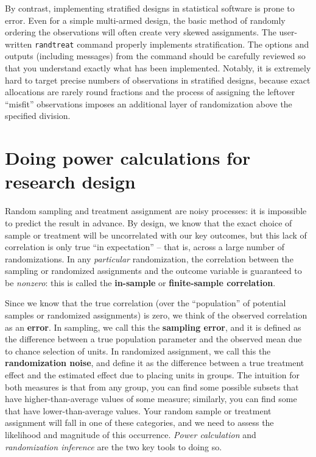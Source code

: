 By contrast, implementing stratified designs in statistical software is prone to error.
Even for a simple multi-armed design,
the basic method of randomly ordering the observations
will often create very skewed assignments.
The user-written \texttt{randtreat} command properly implements stratification.
The options and outputs (including messages) from the command should be carefully reviewed
so that you understand exactly what has been implemented.
Notably, it is extremely hard to target precise numbers of observations
in stratified designs, because exact allocations are rarely round fractions
and the process of assigning the leftover ``misfit'' observations
imposes an additional layer of randomization above the specified division.


\section{Doing power calculations for research design}

Random sampling and treatment assignment are noisy processes:
it is impossible to predict the result in advance.
By design, we know that the exact choice of sample or treatment
will be uncorrelated with our key outcomes,
but this lack of correlation is only true ``in expectation'' --
that is, across a large number of randomizations.
In any \textit{particular} randomization,
the correlation between the sampling or randomized assignments and the outcome variable
is guaranteed to be \textit{nonzero}:
this is called the \textbf{in-sample} or \textbf{finite-sample correlation}.

Since we know that the true correlation
(over the ``population'' of potential samples or randomized assignments)
is zero, we think of the observed correlation as an \textbf{error}.
In sampling, we call this the \textbf{sampling error},
and it is defined as the difference between a true population parameter
and the observed mean due to chance selection of units.
In randomized assignment, we call this the \textbf{randomization noise},
and define it as the difference between a true treatment effect
and the estimated effect due to placing units in groups.
The intuition for both measures is that from any group,
you can find some possible subsets that have higher-than-average values of some measure;
similarly, you can find some that have lower-than-average values.
Your random sample or treatment assignment will fall in one of these categories,
and we need to assess the likelihood and magnitude of this occurrence.
\textit{Power calculation} and \textit{randomization inference} are the two key tools to doing so.

